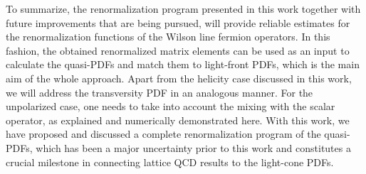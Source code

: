 \medskip
To summarize, the renormalization program presented in this work together with future improvements that are being pursued,
will provide reliable estimates for the renormalization functions of the Wilson line fermion operators. In this fashion, the obtained
renormalized matrix elements can be used as an input to
calculate the quasi-PDFs and match them to light-front PDFs, which is the main aim of the whole approach.
Apart from the helicity case discussed in this work, we will address the transversity PDF in an analogous manner. For the unpolarized case, one needs
to take into account the mixing with the scalar operator, as explained and numerically demonstrated here.
With this work, we have proposed and discussed a complete renormalization program of the quasi-PDFs, which has been a major
uncertainty prior to this work and constitutes a crucial milestone in connecting lattice QCD results to the light-cone PDFs.
